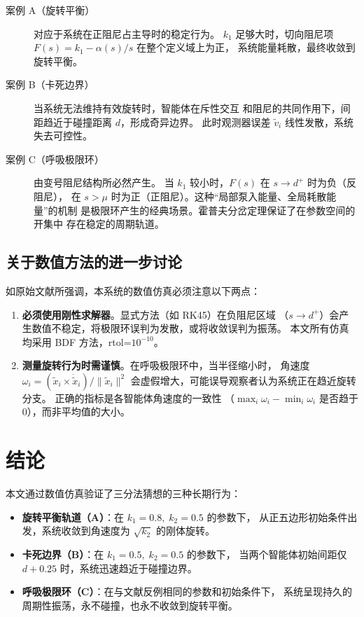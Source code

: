 \documentclass[11pt,a4paper]{article}
\begin{document}
\begin{description}
\item[案例 A（旋转平衡）] 对应于系统在正阻尼占主导时的稳定行为。
$k_1$ 足够大时，切向阻尼项 $F(s)=k_1-\alpha(s)/s$ 在整个定义域上为正，
系统能量耗散，最终收敛到旋转平衡。

\item[案例 B（卡死边界）] 当系统无法维持有效旋转时，智能体在斥性交互
和阻尼的共同作用下，间距趋近于碰撞距离 $d$，形成奇异边界。
此时观测器误差 $\tilde{v}_i$ 线性发散，系统失去可控性。

\item[案例 C（呼吸极限环）] 由变号阻尼结构所必然产生。
当 $k_1$ 较小时，$F(s)$ 在 $s\to d^+$ 时为负（反阻尼），
在 $s>\mu$ 时为正（正阻尼）。这种“局部泵入能量、全局耗散能量”的机制
是极限环产生的经典场景。霍普夫分岔定理保证了在参数空间的开集中
存在稳定的周期轨道。
\end{description}

\subsection{关于数值方法的进一步讨论}

如原始文献所强调，本系统的数值仿真必须注意以下两点：

\begin{enumerate}
\item \textbf{必须使用刚性求解器}。显式方法（如 RK45）在负阻尼区域
（$s \to d^+$）会产生数值不稳定，将极限环误判为发散，或将收敛误判为振荡。
本文所有仿真均采用 BDF 方法，rtol=$10^{-10}$。

\item \textbf{测量旋转行为时需谨慎}。在呼吸极限环中，当半径缩小时，
角速度 $\omega_i = (\tilde{x}_i \times \dot{\tilde{x}}_i)/\|\tilde{x}_i\|^2$
会虚假增大，可能误导观察者认为系统正在趋近旋转分支。
正确的指标是各智能体角速度的一致性
（$\max_i \omega_i - \min_i \omega_i$ 是否趋于 0），而非平均值的大小。
\end{enumerate}

\section{结论}

本文通过数值仿真验证了三分法猜想的三种长期行为：

\begin{itemize}
\item \textbf{旋转平衡轨道（A）}：在 $k_1=0.8,\;k_2=0.5$ 的参数下，
从正五边形初始条件出发，系统收敛到角速度为 $\sqrt{k_2}$ 的刚体旋转。

\item \textbf{卡死边界（B）}：在 $k_1=0.5,\;k_2=0.5$ 的参数下，
当两个智能体初始间距仅 $d+0.25$ 时，系统迅速趋近于碰撞边界。

\item \textbf{呼吸极限环（C）}：在与文献反例相同的参数和初始条件下，
系统呈现持久的周期性振荡，永不碰撞，也永不收敛到旋转平衡。
\end{itemize}
\end{document}
